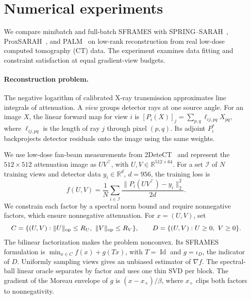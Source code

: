 \section{Numerical experiments}
\label{sec:ct-experiments}

We compare minibatch and full-batch SFRAMES with
SPRING--SARAH~\cite{spring}, ProxSARAH~\cite{proxsarah}, and PALM~\cite{palm}
on low-rank reconstruction from real low-dose computed tomography (CT)
data. The experiment examines data fitting and constraint satisfaction at
equal gradient-view budgets.

\paragraph{Reconstruction problem.}
The negative logarithm of calibrated X-ray transmission approximates line
integrals of attenuation. A \emph{view} groups detector rays at one source
angle. For an image \(X\), the linear forward map for view \(i\) is
\([P_i(X)]_j=\sum_{p,q}\ell_{ij,pq}X_{pq}\), where \(\ell_{ij,pq}\) is
the length of ray \(j\) through pixel \((p,q)\). Its adjoint \(P_i^\ast\)
backprojects detector residuals onto the image using the same weights.

We use low-dose fan-beam measurements from 2DeteCT~\cite{detect} and
represent the \(512\times512\) attenuation image as \(UV^\top\), with
\(U,V\in\mathbb R^{512\times64}\). For a set \(\mathcal I\) of \(N\)
training views and detector data \(y_i\in\mathbb R^d\), \(d=956\), the
training loss is
\begin{equation}
  f(U,V)=\frac1N\sum_{i\in\mathcal I}
          \frac{\|P_i(UV^\top)-y_i\|_2^2}{2d}.
  \label{eq:ct-loss}
\end{equation}
We constrain each factor by a spectral norm bound and require nonnegative
factors, which ensure nonnegative attenuation. For \(x=(U,V)\), set
\[
 C=\{(U,V):\|U\|_{\rm op}\le R_U,\ \|V\|_{\rm op}\le R_V\},
 \qquad D=\{(U,V):U\ge0,\ V\ge0\}.
\]
The bilinear factorization makes the problem nonconvex. Its SFRAMES
formulation is \(\min_{x\in C} f(x)+g(Tx)\), with
\(T=\operatorname{Id}\) and \(g=\iota_D\), the indicator of \(D\).
Uniformly sampling views gives an unbiased estimator of \(\nabla f\).
The spectral-ball linear oracle separates by factor and uses one thin SVD
per block. The gradient of the Moreau envelope of \(g\) is
\((x-x_+)/\beta\), where \(x_+\) clips both factors to nonnegativity.

